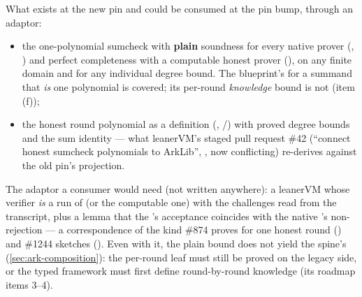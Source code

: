 What exists at the new pin and could be consumed at the pin bump, through an adaptor:
\begin{itemize}
\item the one-polynomial sumcheck with \textbf{plain} soundness  for every
  native prover (, ) and
  perfect completeness with a computable honest prover
  (), on any finite domain and for any individual
  degree bound. The blueprint's  for a summand that \emph{is}
  one polynomial is covered; its per-round \emph{knowledge} bound is not (item (f));
\item the honest round polynomial as a definition
  (,
  /) with proved degree
  bounds and the sum identity --- what leanerVM's staged pull request \#42 (``connect honest
  sumcheck polynomials to ArkLib'', , now conflicting)
  re-derives against the old pin's  projection.
\end{itemize}

The adaptor a consumer would need (not written anywhere): a leanerVM  whose
verifier \emph{is} a run of  (or the computable one) with the
challenges read from the  transcript, plus a lemma that the
's acceptance coincides with the native 's non-rejection ---
a correspondence of the kind \#874 proves for one honest round
() and \#1244 sketches ().
Even with it, the plain bound does not yield the spine's
 (\cref{sec:ark-composition}): the per-round leaf must
still be proved on the legacy side, or the typed framework must first define round-by-round
knowledge (its roadmap items 3--4).

